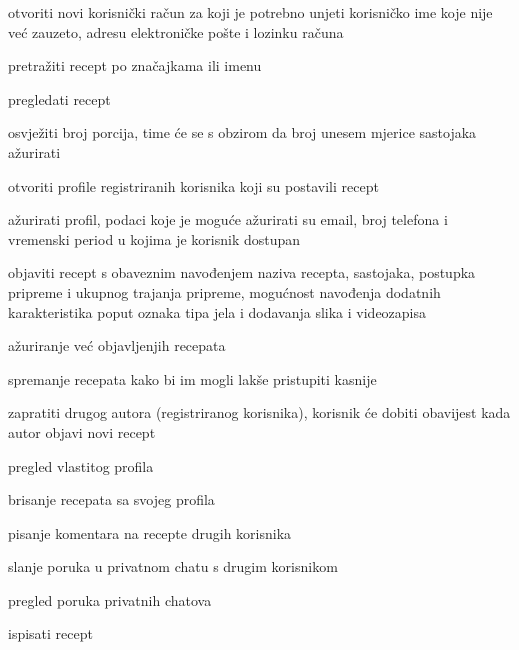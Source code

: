 			
			\begin{packed_enum}
				\item  {}
				
				\begin{packed_enum}
					
					\item otvoriti novi korisnički račun za koji je potrebno unjeti korisničko ime koje nije već zauzeto, adresu elektroničke pošte i lozinku računa
					\item pretražiti recept po značajkama ili imenu
					\item pregledati recept
					\item osvježiti broj porcija, time će se s obzirom da broj unesem mjerice sastojaka ažurirati
					\item otvoriti profile registriranih korisnika koji su postavili recept
					
				\end{packed_enum}

				\item  {}
				
				\begin{packed_enum}
					
					\item ažurirati profil, podaci koje je moguće ažurirati su email, broj telefona i vremenski period u kojima je korisnik dostupan
					\item objaviti recept s obaveznim navođenjem naziva recepta, sastojaka, postupka pripreme i ukupnog trajanja pripreme, mogućnost navođenja dodatnih karakteristika poput oznaka tipa jela i dodavanja slika i videozapisa
					\item ažuriranje već objavljenjih recepata
					\item spremanje recepata kako bi im mogli lakše pristupiti kasnije
					\item zapratiti drugog autora (registriranog korisnika), korisnik će dobiti obavijest kada autor objavi novi recept
					\item pregled vlastitog profila
					\item brisanje recepata sa svojeg profila
					\item pisanje komentara na recepte drugih korisnika
					\item slanje poruka u privatnom chatu s drugim korisnikom
					\item pregled poruka privatnih chatova
					\item ispisati recept
					

\end{packed_enum}
\end{packed_enum}

